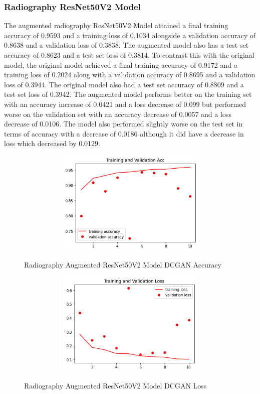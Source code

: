 \subsubsection{Radiography ResNet50V2 Model}
The augmented radiography ResNet50V2 Model attained a final training accuracy of 0.9593 and a training loss of 0.1034 alongside a validation accuracy of 0.8638 and a validation loss of 0.3838.  The augmented model also has a test set accuracy of 0.8623 and a test set loss of 0.3814.  To contrast this with the original model, the original model achieved a final training accuracy of 0.9172 and a training loss of 0.2024 along with a validation accuracy of 0.8695 and a validation loss of 0.3944.  The original model also had a test set accuracy of 0.8809 and a test set loss of 0.3942.  The augmented model performs better on the training set with an accuracy increase of 0.0421 and a loss decrease of 0.099 but performed worse on the validation set with an accuracy decrease of 0.0057 and a loss decrease of 0.0106.   The model also performed slightly worse on the test set in terms of accuracy with a decrease of 0.0186 although it did have a decrease in loss which decreased by 0.0129.
 \begin{figure}[H]
    \centering    \includegraphics[width=1\textwidth,height=5cm,keepaspectratio]{Images/RadiographyCNNResNet50V2TrainAndValAccAugmentedDCGAN.png}\\
    \caption{Radiography Augmented ResNet50V2 Model DCGAN Accuracy}
    \label{fig:Radiography Augmented ResNet50V2 Model DCGAN Accuracy}
\end{figure}
 \begin{figure}[H]
    \centering
    \includegraphics[width=1\textwidth,height=5cm,keepaspectratio]{Images/RadiographyCNNResNet50V2TrainAndValLossAugmentedDCGAN.png}\\
    \caption{Radiography Augmented ResNet50V2 Model DCGAN Loss}
    \label{fig:Radiography Augmented ResNet50V2 Model DCGAN Loss}
\end{figure}

